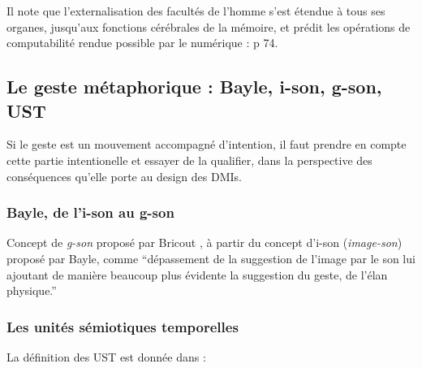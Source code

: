Il note que l’externalisation des facultés de l’homme s’est étendue à tous ses organes, jusqu'aux fonctions cérébrales de la mémoire, et prédit les opérations de computabilité rendue possible par le numérique :
 \cite{leroi-gourhan_geste_2013-1}  p 74.




\subsection{Le geste métaphorique : Bayle, i-son, g-son, UST}
Si le geste est un mouvement accompagné d'intention, il faut prendre en compte cette partie intentionelle et essayer de la qualifier, dans la perspective des conséquences qu'elle porte au design des \glspl{DMI}.

\subsubsection{Bayle, de l'i-son au g-son}

Concept de \textit{g-son} proposé par Bricout \cite{bricout_les_2011}, à partir du concept d'i-son (\textit{image-son}) proposé par Bayle, comme ``dépassement de la suggestion de l'image par le son lui ajoutant de manière beaucoup plus évidente la suggestion du geste, de l'élan physique.''



\subsubsection{Les unités sémiotiques temporelles}

La définition des UST est donnée dans \cite{timsit-berthier_les_2004}:



